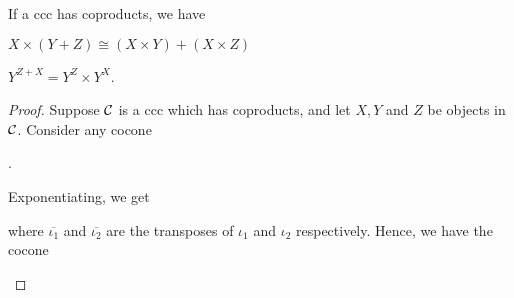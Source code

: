 \begin{exercise}{48}
    If a ccc has coproducts, we have
    \begin{exercises}
        \item $X\times(Y+Z)\cong(X\times Y)+(X\times Z)$
        \item $Y^{Z+X}=Y^Z\times Y^X$.
    \end{exercises}
\end{exercise}
\begin{solution}
   \begin{exercises}
       \item\begin{proof}
            Suppose $\mathcal{C}$ is a ccc which has coproducts, and let $X,Y$ and $Z$ be objects in $\mathcal{C}$.
            Consider any cocone 
            \begin{center}
                .
            \end{center}
            Exponentiating, we get
            \begin{center}
            \end{center}
            where $\overline{\iota_1}$ and $\overline{\iota_2}$ are the transposes of $\iota_1$ and $\iota_2$ respectively.
            Hence, we have the cocone
            \begin{center}
\end{center}
\end{proof}
\end{exercises}
\end{solution}
